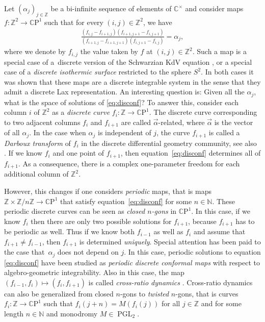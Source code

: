 \documentclass[pdftex]{sigma}
\numberwithin{equation}{section}
\newcommand{\Z}{{\mathbb Z}}
\newcommand{\N}{{\mathbb N}}
\newcommand{\C}{{\mathbb C}}
\newcommand{\CP}{{\mathbb C\mathrm P}}
\newcommand{\PGL}{\operatorname{PGL}}
\begin{document}
	Let $(\alpha_j)_{j\in\Z}$ be a bi-infinite sequence of elements of $ \C^\times$ and consider maps $f\colon \Z^2 \rightarrow \CP^1$ such that for every $(i,j)\in\Z^2$, we have
	\begin{align}
		\frac{(f_{i,j}-f_{i+1,j})(f_{i+1,j+1}-f_{i,j+1}) }{(f_{i+1,j}-f_{i+1,j+1})(f_{i,j+1}-f_{i,j})} = \alpha_j,
		\label{eq:disconf}
	\end{align}
	where we denote by $f_{i,j}$ the value taken by $f$ at $(i,j)\in\Z^2$. Such a map is a special case of a~discrete version of the Schwarzian KdV equation \cite{NC}, or a special case of a \emph{discrete isothermic surface} \cite{BP} restricted to the sphere $S^2$. In both cases it was shown that these maps are a discrete integrable system in the sense that they admit a discrete Lax representation. An interesting question is: Given all the $\alpha_j$, what is the space of solutions of \eqref{eq:disconf}? To answer this, consider each column $i$ of $\Z^2$ as a \emph{discrete curve} $f_i\colon \Z\rightarrow \CP^1$. The discrete curve corresponding to two adjacent columns $f_i$ and $f_{i+1}$ are called $\vec\alpha$-related, where $\vec\alpha$ is the vector of all $\alpha_j$. In the case when $\alpha_j$ is independent of $j$, the curve $f_{i+1}$ is called a \emph{Darboux transform} \cite{hjbook} of $f_i$ in the discrete differential geometry community, see also \cite{bsddgbook}. If we know $f_i$ and one point of $f_{i+1}$, then equation~\eqref{eq:disconf} determines all of $f_{i+1}$. As a consequence, there is a complex one-parameter freedom for each additional column of $\Z^2$.
	
	However, this changes if one considers \emph{periodic} maps, that is maps $\Z \times \Z/n\Z\rightarrow \CP^1$ that satisfy equation~\eqref{eq:disconf} for some $n\in \N$. These periodic discrete curves can be seen as \emph{closed $n$-gons} in $\CP^1$. In this case, if we know $f_i$ then there are only two possible solutions for $f_{i+1}$, because $f_{i+1}$ has to be periodic as well. Thus if we know both $f_{i-1}$ as well as $f_i$ and assume that $f_{i+1} \neq f_{i-1}$, then $f_{i+1}$ is determined \emph{uniquely}. Special attention has been paid to the case that~$\alpha_j$ does not depend on $j$. In this case, periodic solutions to equation \eqref{eq:disconf} have been studied as \emph{periodic discrete conformal maps} \cite{HMNP} with respect to algebro-geometric integrability. Also in this case, the map $(f_{i-1},f_i) \mapsto (f_i,f_{i+1})$ is called \emph{cross-ratio dynamics} \cite{AFIT}. Cross-ratio dynamics can also be generalized from closed $n$-gons to \emph{twisted} $n$-gons, that is curves $f_i\colon \Z \rightarrow \CP^1$ such that $f_i(j+n) = M(f_i(j))$ for all $j\in \Z$ and for some {length} $n\in \N$ and monodromy $M\in \PGL_2$.
	
\end{document}

